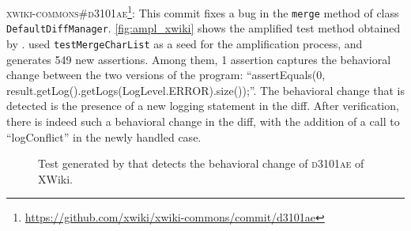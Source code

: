 \textsc{xwiki-commons\#d3101ae}\footnote{\url{https://github.com/xwiki/xwiki-commons/commit/d3101ae}}: This commit fixes a bug in the \texttt{merge} method of class \texttt{DefaultDiffManager}.
\autoref{fig:ampl_xwiki} shows the amplified test method obtained by \DCIA.
\DCI used \texttt{testMergeCharList} as a seed for the amplification process, and generates 549 new assertions.
Among them, 1 assertion captures the behavioral change between the two versions of the program: 
``assertEquals(0, result.getLog().getLogs(LogLevel.ERROR).size());''.
The behavioral change that is detected is the presence of a new logging statement in the diff. 
After verification, there is indeed such a behavioral change in the diff, with the addition of a call to ``logConflict'' in the newly handled case.

\begin{figure}[h]
\centering
{}
\caption{Test generated by \DCIA that detects the behavioral change of \textsc{d3101ae} of XWiki.}
\label{fig:ampl_xwiki}
\end{figure}


